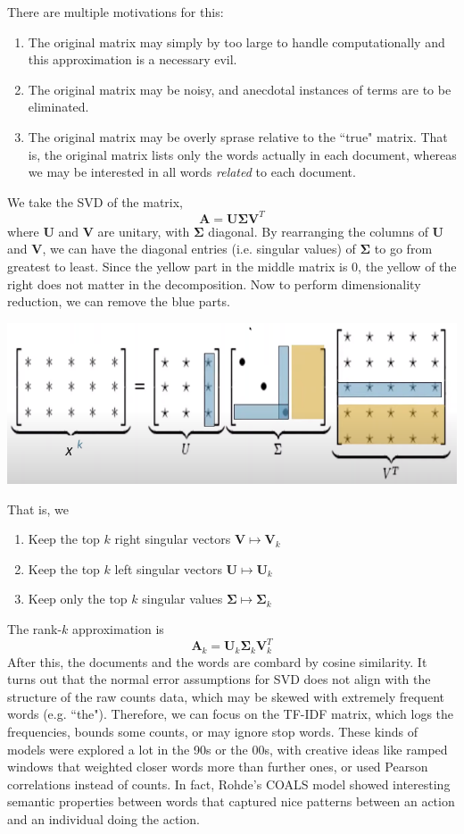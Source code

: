 \documentclass{article}
\begin{document}
    There are multiple motivations for this: 
    \begin{enumerate}
      \item The original matrix may simply by too large to handle computationally and this approximation is a necessary evil. 
      \item The original matrix may be noisy, and anecdotal instances of terms are to be eliminated. 
      \item The original matrix may be overly sprase relative to the ``true" matrix. That is, the original matrix lists only the words actually in each document, whereas we may be interested in all words \textit{related} to each document. 
    \end{enumerate}
    We take the SVD of the matrix, 
    \[\mathbf{A} = \mathbf{U} \boldsymbol{\Sigma} \mathbf{V}^T\]
    where $\mathbf{U}$ and $\mathbf{V}$ are unitary, with $\boldsymbol{\Sigma}$ diagonal. By rearranging the columns of $\mathbf{U}$ and $\mathbf{V}$, we can have the diagonal entries (i.e. singular values) of $\boldsymbol{\Sigma}$ to go from greatest to least. Since the yellow part in the middle matrix is $0$, the yellow of the right does not matter in the decomposition. Now to perform dimensionality reduction, we can remove the blue parts. 
    \begin{center}
      \includegraphics[scale=0.3]{img/SVD.png}
    \end{center}
    That is, we 
    \begin{enumerate}
      \item Keep the top $k$ right singular vectors $\mathbf{V} \mapsto \mathbf{V}_k$ 
      \item Keep the top $k$ left singular vectors $\mathbf{U} \mapsto \mathbf{U}_k$
      \item Keep only the top $k$ singular values $\boldsymbol{\Sigma} \mapsto \boldsymbol{\Sigma}_k$
    \end{enumerate}
    The rank-$k$ approximation is 
    \[\mathbf{A}_k = \mathbf{U}_k \boldsymbol{\Sigma}_k \mathbf{V}_k^T\]
    After this, the documents and the words are combard by cosine similarity. It turns out that the normal error assumptions for SVD does not align with the structure of the raw counts data, which may be skewed with extremely frequent words (e.g. ``the"). Therefore, we can focus on the TF-IDF matrix, which logs the frequencies, bounds some counts, or may ignore stop words. These kinds of models were explored a lot in the 90s or the 00s, with creative ideas like ramped windows that weighted closer words more than further ones, or used Pearson correlations instead of counts. In fact, Rohde's COALS model showed interesting semantic properties between words that captured nice patterns between an action and an individual doing the action. 
\end{document}
